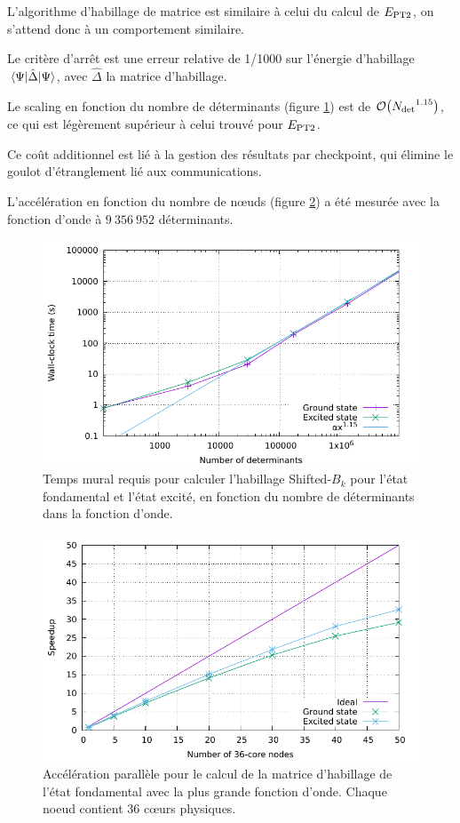 \documentclass[./thesis.tex]{subfiles}
\begin{document}
L'algorithme d'habillage de matrice est similaire à celui du calcul de $E_\text{PT2}$, on s'attend donc à un comportement similaire.

Le critère d’arrêt est une erreur relative de 1/1000 sur l'énergie d'habillage $\mel{\Psi}{\hat \Delta}{\Psi}$, avec $\hat \Delta$ la matrice d'habillage.

Le scaling en fonction du nombre de déterminants (figure \ref{fig:scaling_det_sbk_fr}) est de $\order{\Ndet^{1.15}}$, ce qui est légèrement supérieur à celui trouvé pour $E_\text{PT2}$. 

Ce coût additionnel est lié à la gestion des résultats par checkpoint, qui élimine le goulot d'étranglement lié aux communications. 

L'accélération en fonction du nombre de nœuds (figure \ref{fig:scaling_node_sbk_fr}) a été mesurée avec la fonction d'onde à $9~356~952$ déterminants.

\begin{figure}[h!]
        \begin{center}
                \includegraphics[width=0.8\columnwidth]{figures/perf/scaling_sbk_det}
                \caption{Temps mural requis pour calculer l'habillage Shifted-$B_k$ pour l'état fondamental et l'état excité, en fonction du nombre de déterminants dans la fonction d'onde.}
                \label{fig:scaling_det_sbk_fr}
        \end{center}
\end{figure}
\begin{figure}[hbt!]
        \begin{center}
                \includegraphics[width=0.8\columnwidth]{figures/perf/scaling_sbk_node}
                \caption{Accélération parallèle pour le calcul de la matrice d'habillage de l'état fondamental avec la plus grande fonction d'onde. Chaque noeud contient 36 cœurs physiques.}
                \label{fig:scaling_node_sbk_fr}
        \end{center}
\end{figure}
\end{document}
